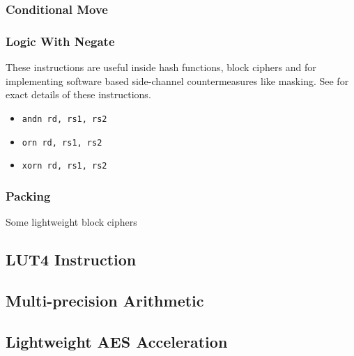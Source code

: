 \todo{}


\subsubsection{Conditional Move}

\todo{}


\subsubsection{Logic With Negate}

These instructions are useful inside hash functions, block ciphers and
for implementing software based side-channel countermeasures like masking.
See \cite[Section 2.1.3]{riscv:bitmanip:draft} for exact details of
these instructions.

\begin{itemize}
\item {\tt andn rd, rs1, rs2}
\item {\tt  orn rd, rs1, rs2}
\item {\tt xorn rd, rs1, rs2}
\end{itemize}


\subsubsection{Packing}

Some lightweight block ciphers

\todo{}



\subsection{LUT4 Instruction}

\todo{}


\subsection{Multi-precision Arithmetic}

\todo{}


\subsection{Lightweight AES Acceleration}

